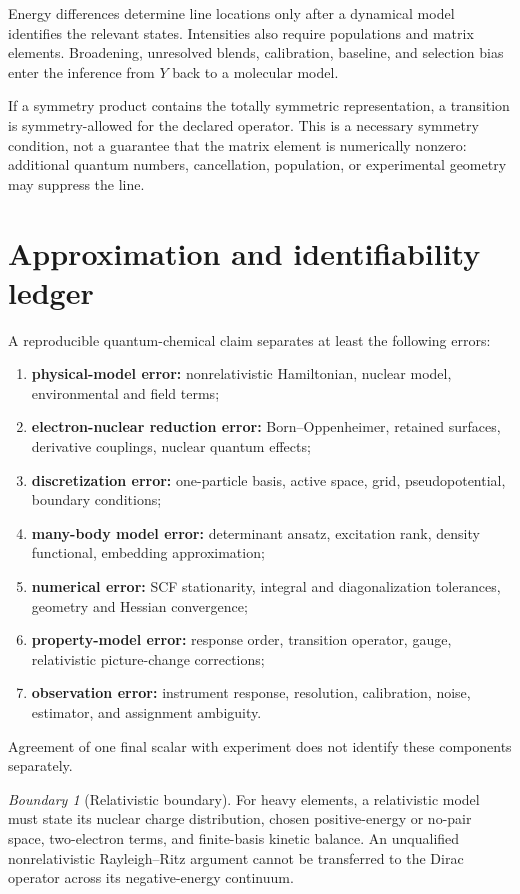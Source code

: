 \documentclass[11pt,a4paper]{article}
\theoremstyle{definition}
\theoremstyle{plain}
\theoremstyle{remark}
\newtheorem{warning}[definition]{Boundary}
\begin{document}
Energy differences determine line locations only after a dynamical
model identifies the relevant states.  Intensities also require
populations and matrix elements.  Broadening, unresolved blends,
calibration, baseline, and selection bias enter the inference from
\(Y\) back to a molecular model.

If a symmetry product contains the totally symmetric
representation, a transition is symmetry-allowed for the declared
operator.  This is a necessary symmetry condition, not a guarantee
that the matrix element is numerically nonzero: additional quantum
numbers, cancellation, population, or experimental geometry may
suppress the line.

\section{Approximation and identifiability ledger}

A reproducible quantum-chemical claim separates at least the
following errors:
\begin{enumerate}[leftmargin=*,itemsep=2pt]
\item \textbf{physical-model error:} nonrelativistic Hamiltonian,
      nuclear model, environmental and field terms;
\item \textbf{electron-nuclear reduction error:} Born--Oppenheimer,
      retained surfaces, derivative couplings, nuclear quantum
      effects;
\item \textbf{discretization error:} one-particle basis, active space,
      grid, pseudopotential, boundary conditions;
\item \textbf{many-body model error:} determinant ansatz, excitation
      rank, density functional, embedding approximation;
\item \textbf{numerical error:} SCF stationarity, integral and
      diagonalization tolerances, geometry and Hessian convergence;
\item \textbf{property-model error:} response order, transition
      operator, gauge, relativistic picture-change corrections;
\item \textbf{observation error:} instrument response, resolution,
      calibration, noise, estimator, and assignment ambiguity.
\end{enumerate}
Agreement of one final scalar with experiment does not identify these
components separately.

\begin{warning}[Relativistic boundary]
For heavy elements, a relativistic model must state its nuclear charge
distribution, chosen positive-energy or no-pair space, two-electron
terms, and finite-basis kinetic balance.  An unqualified
nonrelativistic Rayleigh--Ritz argument cannot be transferred to the
Dirac operator across its negative-energy continuum.
\end{warning}
\end{document}
